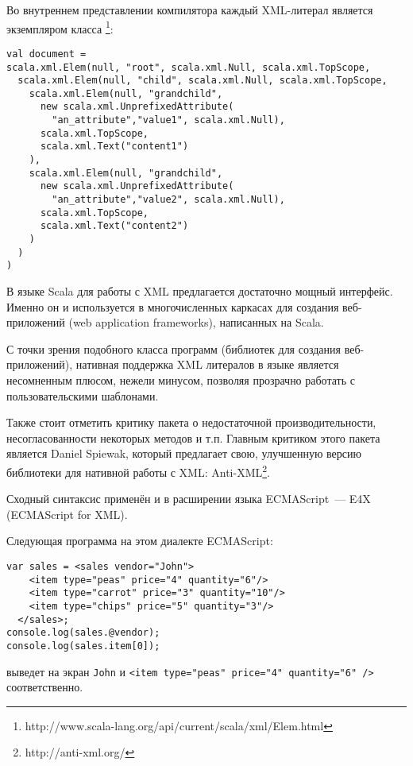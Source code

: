 \begin{code}
Во внутреннем представлении компилятора каждый XML-литерал является экземпляром класса \footnote{http://www.scala-lang.org/api/current/scala/xml/Elem.html}:

\begin{lstlisting}[caption={Внутреннее представление XML литералов из примера~\ref{scala-xml-example}.}, label={scala-xml-example-internal}]
val document =
scala.xml.Elem(null, "root", scala.xml.Null, scala.xml.TopScope,
  scala.xml.Elem(null, "child", scala.xml.Null, scala.xml.TopScope,
    scala.xml.Elem(null, "grandchild",
      new scala.xml.UnprefixedAttribute(
        "an_attribute","value1", scala.xml.Null),
      scala.xml.TopScope,
      scala.xml.Text("content1")
    ),
    scala.xml.Elem(null, "grandchild",
      new scala.xml.UnprefixedAttribute(
        "an_attribute","value2", scala.xml.Null),
      scala.xml.TopScope,
      scala.xml.Text("content2")
    )
  )
)
\end{lstlisting}\end{code}

В языке Scala для работы с XML предлагается достаточно мощный интерфейс. Именно он и используется в многочисленных каркасах для создания веб-приложений (web application frameworks), написанных на Scala.

С точки зрения подобного класса программ (библиотек для создания веб-приложений), нативная поддержка XML
литералов в языке является несомненным плюсом, нежели минусом, позволяя прозрачно работать с пользовательскими шаблонами.

Также стоит отметить критику пакета  о недостаточной производительности, несогласованности некоторых методов и т.п.
Главным критиком этого пакета является Daniel Spiewak, который предлагает свою, улучшенную версию библиотеки для нативной работы с XML: Anti-XML\footnote{http://anti-xml.org/}.

Сходный синтаксис применён и в расширении языка ECMAScript~--- E4X~\cite{E4X} (ECMAScript for XML).

\begin{code}
Следующая программа на этом диалекте ECMAScript:

\begin{lstlisting}[caption={Пример использования XML литеров в языке ECMAScript for XML.}, label=e4x-xml-example]
var sales = <sales vendor="John">
    <item type="peas" price="4" quantity="6"/>
    <item type="carrot" price="3" quantity="10"/>
    <item type="chips" price="5" quantity="3"/>
  </sales>;
console.log(sales.@vendor);
console.log(sales.item[0]);
\end{lstlisting}
выведет на экран \texttt{John} и \texttt{<item type="peas"\ price="4"\ quantity="6"\ />} соответственно.
\end{code}

